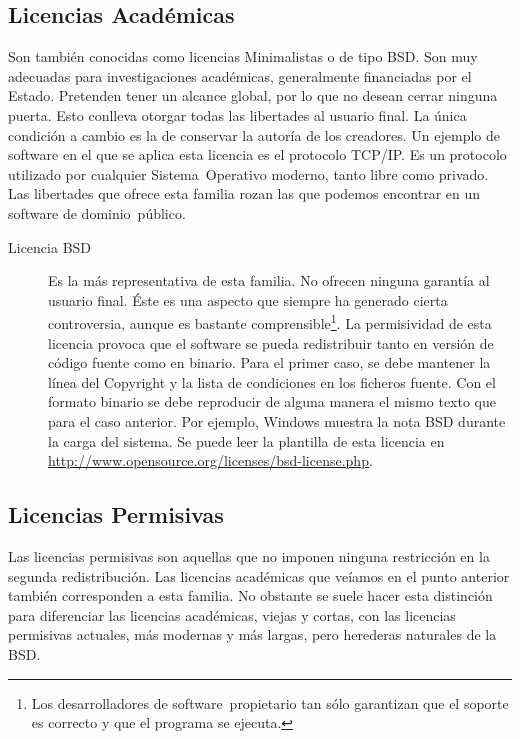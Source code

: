 \subsection{Licencias Académicas}
Son también conocidas como licencias Minimalistas o de tipo BSD. Son
muy adecuadas para investigaciones académicas, generalmente
financiadas por el Estado. Pretenden tener un alcance global, por lo
que no desean cerrar ninguna puerta. Esto conlleva otorgar todas las
libertades al usuario final. La única condición a cambio es la de
conservar la autoría de los creadores. Un ejemplo de software en el
que se aplica esta licencia es el protocolo TCP/IP. Es un protocolo
utilizado por cualquier Sistema~Operativo moderno, tanto libre como
privado. Las libertades que ofrece esta familia rozan las que podemos
encontrar en un software de dominio~público.
\begin{description}
\item[Licencia BSD] Es la más representativa de esta familia. No
  ofrecen ninguna garantía al usuario final. Éste es una aspecto que
  siempre ha generado cierta controversia, aunque es bastante
  comprensible\footnote{Los desarrolladores de software~propietario
    tan sólo garantizan que el soporte es correcto y que el programa
    se ejecuta.}. La permisividad de esta licencia provoca que el
  software se pueda redistribuir tanto en versión de código fuente
  como en binario. Para el primer caso, se debe mantener la línea del
  Copyright y la lista de condiciones en los ficheros fuente. Con el
  formato binario se debe reproducir de alguna manera el mismo texto
  que para el caso anterior. Por ejemplo, Windows muestra la nota BSD
  durante la carga del sistema. Se puede leer la plantilla de esta
  licencia en
  \url{http://www.opensource.org/licenses/bsd-license.php}.
\end{description}

\subsection{Licencias Permisivas}

Las licencias permisivas son aquellas que no imponen ninguna
restricción en la segunda redistribución. Las licencias académicas que
veíamos en el punto anterior también corresponden a esta familia. No
obstante se suele hacer esta distinción para diferenciar las licencias
académicas, viejas y cortas, con las licencias permisivas actuales,
más modernas y más largas, pero herederas naturales de la BSD.

